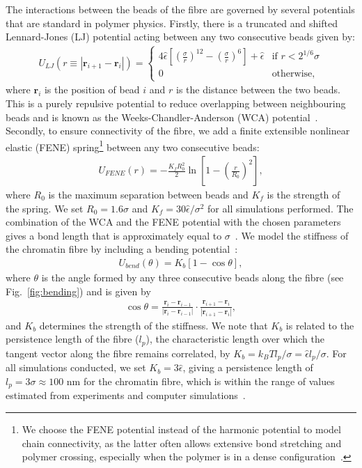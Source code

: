 \documentclass[12pt]{article}
\newcommand{\abs}[1]{\left|#1\right|}
\begin{document}
The interactions between the beads of the fibre are governed by several potentials that are standard in polymer physics. Firstly, there is a truncated and shifted Lennard-Jones (LJ) potential acting between any two consecutive beads given by:
\begin{eqnarray}
\label{eqn:WCA}
U_{LJ}(r \equiv |\bm{r}_{i+1} - \bm{r}_i|) = \left\{ 
	\begin{array}{ll}
		4\hat{\epsilon} \left[\left(\frac{\sigma}{r}\right)^{12} - \left(\frac{\sigma}{r}\right)^6\right] + \hat{\epsilon} & \textrm{if $r < 2^{1/6}\sigma$}\\
		0 & \textrm{otherwise},
	\end{array}
\right.
\end{eqnarray}
where $\bm{r}_i$ is the position of bead $i$ and $r$ is the distance between the two beads. This is a purely repulsive potential to reduce overlapping between neighbouring beads and is known as the Weeks-Chandler-Anderson (WCA) potential~\cite{weeks1971}. Secondly, to ensure connectivity of the fibre, we add a finite extensible nonlinear elastic (FENE) spring\footnote{We choose the FENE potential instead of the harmonic potential to model chain connectivity, as the latter often allows extensive bond stretching and polymer crossing, especially when the polymer is in a dense configuration~\cite{michielettoThesis}.} between any two consecutive beads:
\begin{eqnarray}
U_{FENE}(r) = - \frac{K_fR_0^2}{2}\ln\left[1-\left(\frac{r}{R_0}\right)^2\right],
\end{eqnarray}
where $R_0$ is the maximum separation between beads and $K_f$ is the strength of the spring. We set $R_0 = 1.6\sigma$ and $K_f = 30\hat{\epsilon}/\sigma^2$ for all simulations performed. The combination of the WCA and the FENE potential with the chosen parameters gives a bond length that is approximately equal to $ \sigma$~\cite{brackley2013}. We model the stiffness of the chromatin fibre by including a bending potential~\cite{kremer1990}:
\begin{eqnarray}
U_{bend}(\theta) = K_b\left[1-\cos\theta\right],
\end{eqnarray}
where $\theta$ is the angle formed by any three consecutive beads along the fibre (see Fig.~\ref{fig:bending}) and is given by
\begin{eqnarray}
\cos \theta = \frac{\bm{r}_i - \bm{r}_{i-1}}{\abs{\bm{r}_i - \bm{r}_{i-1}}} \cdot \frac{\bm{r}_{i+1} - \bm{r}_i}{\abs{\bm{r}_{i+1} - \bm{r}_i}},
\end{eqnarray}
and $K_b$ determines the strength of the stiffness. We note that $K_b$ is related to the persistence length of the fibre ($l_p$), the characteristic length over which the tangent vector along the fibre remains correlated, by $K_b = k_BTl_p/\sigma = \hat{\epsilon}l_p/\sigma$. For all simulations conducted, we set $K_b = 3\hat{\epsilon}$, giving a persistence length of $l_p = 3\sigma \approx 100$ nm for the chromatin fibre, which is within the range of values estimated from experiments and computer simulations~\cite{dekker2002, bystricky2004, aumann2006}.
\end{document}
